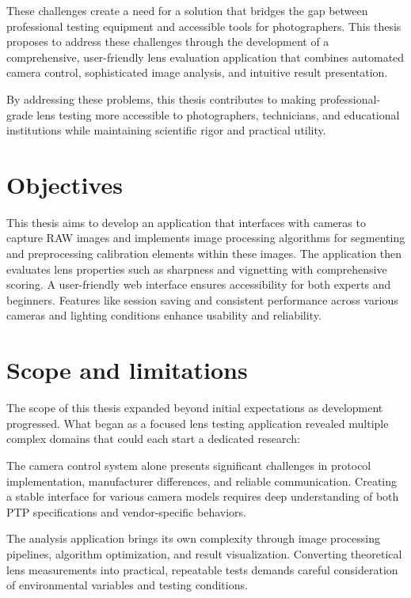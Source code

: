 These challenges create a need for a solution that bridges the gap between professional testing equipment and accessible tools for photographers. This thesis proposes to address these challenges through the development of a comprehensive, user-friendly lens evaluation application that combines automated camera control, sophisticated image analysis, and intuitive result presentation.

By addressing these problems, this thesis contributes to making professional-grade lens testing more accessible to photographers, technicians, and educational institutions while maintaining scientific rigor and practical utility.


\section*{Objectives}
This thesis aims to develop an application that interfaces with cameras to capture RAW images and implements image processing algorithms for segmenting and preprocessing calibration elements within these images. The application then evaluates lens properties such as sharpness and vignetting with comprehensive scoring. A user-friendly web interface ensures accessibility for both experts and beginners. Features like session saving and consistent performance across various cameras and lighting conditions enhance usability and reliability.

\section*{Scope and limitations}


The scope of this thesis expanded beyond initial expectations as development progressed. What began as a focused lens testing application revealed multiple complex domains that could each start a dedicated research:

The camera control system alone presents significant challenges in protocol implementation, manufacturer differences, and reliable communication. Creating a stable interface for various camera models requires deep understanding of both PTP specifications and vendor-specific behaviors.

The analysis application brings its own complexity through image processing pipelines, algorithm optimization, and result visualization. Converting theoretical lens measurements into practical, repeatable tests demands careful consideration of environmental variables and testing conditions.

